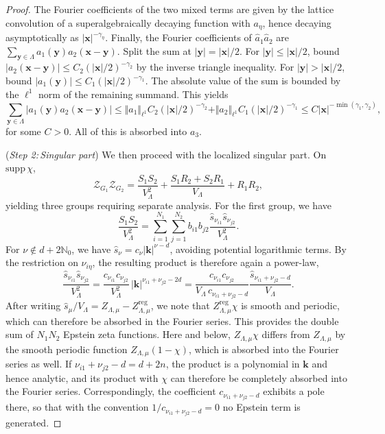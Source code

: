 \documentclass[]{amsart}
\numberwithin{mythm}{section}
\begin{document}
\begin{proof}
The Fourier coefficients of the two mixed terms are given by the lattice convolution of a superalgebraically decaying function with $a_\eta$, hence decaying asymptotically as $|\bm x|^{-\gamma_\eta}$. 
Finally, the Fourier coefficients of $\hat a_1 \hat a_2$ are $\sum_{\bm y\in \Lambda}a_1(\bm y)a_2(\bm x-\bm y)$. Split the sum at $|\bm y|=|\bm x|/2$. For $|\bm y|\le |\bm x|/2$, bound $|a_2(\bm x-\bm y)|\le C_2(|\bm x|/2)^{-\gamma_2}$ by the inverse triangle inequality. For $|\bm y|>|\bm x|/2$, bound $|a_1(\bm y)|\le C_1 (|\bm x|/2)^{-\gamma_1}$. The absolute value of the sum is bounded by the $\ell^1$ norm of the remaining summand. This yields
\[
\sum_{\bm y\in \Lambda}|a_1(\bm y) a_2(\bm x-\bm y)|\le \Vert a_1\Vert_{\ell^1}C_2(|\bm x|/2)^{-\gamma_2}+\Vert a_2\Vert_{\ell^1}C_1(|\bm x|/2)^{-\gamma_1}\le C |\bm x|^{-\min(\gamma_1,\gamma_2)},
\]
for some $C>0$. All of this is absorbed into $a_3$.

(\emph{Step 2:\,Singular part}) We then proceed with the localized singular part. On $\mathrm{supp}\,\chi$,
\[
\mathcal Z_{G_1}\mathcal Z_{G_2}
=\frac{S_1S_2}{V_\Lambda^{2}}
+\frac{S_1R_2+S_2R_1}{V_\Lambda}
+R_1R_2,
\]
yielding three groups requiring separate analysis. 
For the first group, we have
\[
\frac{S_1S_2}{V_\Lambda^{2}}=\sum_{i=1}^{N_1}\sum_{j=1}^{N_2}b_{i1}b_{j2} \frac{\hat s_{\nu_{i1}}\hat s_{\nu_{j2}}}{V_\Lambda^{2}}.
\]
For $\nu\notin d+2\mathds N_0$, we have $\hat s_\nu=c_\nu|\bm k|^{\nu-d}$, avoiding potential logarithmic terms. By the restriction on $\nu_{i\eta}$, the resulting product is therefore again a power-law,
\[
\frac{\hat s_{\nu_{i1}}\hat s_{\nu_{j2}}}{V_\Lambda^{2}}=\frac{c_{\nu_{i1}}c_{\nu_{j2}}}{V_\Lambda^{2}}\,|\bm k|^{\nu_{i1}+\nu_{j2}-2d}=\frac{c_{\nu_{i1}}c_{\nu_{j2}}}{V_\Lambda\,c_{\nu_{i1}+\nu_{j2}-d}}\frac{\hat s_{\nu_{i1}+\nu_{j2}-d}}{V_\Lambda}.
\]
After writing $\hat s_\mu/V_\Lambda=Z_{\Lambda,\mu}-Z^{\mathrm{reg}}_{\Lambda,\mu}$, we note that $Z^{\mathrm{reg}}_{\Lambda,\mu}\chi$ is smooth and periodic, which can therefore be absorbed in the Fourier series. This provides the double sum of $N_1N_2$ Epstein zeta functions. Here and below, $Z_{\Lambda,\mu}\chi$ differs from $Z_{\Lambda,\mu}$ by the smooth periodic function $Z_{\Lambda,\mu}(1-\chi)$, which is absorbed into the Fourier series as well. If $\nu_{i1}+\nu_{j2}-d=d+2n$, the product is a polynomial in $\bm k$ and hence analytic, and its product with $\chi$ can therefore be completely absorbed into the Fourier series. Correspondingly, the coefficient $c_{\nu_{i1}+\nu_{j2}-d}$ exhibits a pole there, so that with the convention $1/c_{\nu_{i1}+\nu_{j2}-d}=0$ no Epstein term is generated.


\end{proof}
\end{document}
